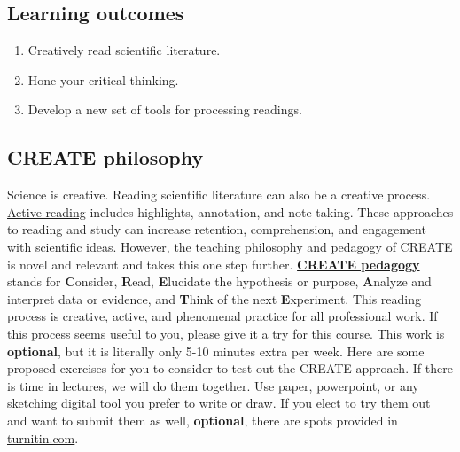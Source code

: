 \documentclass[
]{book}
\providecommand{\tightlist}{%
  \setlength{\itemsep}{0pt}\setlength{\parskip}{0pt}}
\begin{document}
\hypertarget{learning-outcomes-3}{%
\subsection*{Learning outcomes}\label{learning-outcomes-3}}

\begin{enumerate}
\def\labelenumi{\arabic{enumi}.}
\tightlist
\item
  Creatively read scientific literature.\\
\item
  Hone your critical thinking.\\
\item
  Develop a new set of tools for processing readings.
\end{enumerate}

\hypertarget{create-philosophy}{%
\subsection*{CREATE philosophy}\label{create-philosophy}}

Science is creative. Reading scientific literature can also be a creative process. \href{https://help.open.ac.uk/active-reading}{Active reading} includes highlights, annotation, and note taking. These approaches to reading and study can increase retention, comprehension, and engagement with scientific ideas. However, the teaching philosophy and pedagogy of CREATE is novel and relevant and takes this one step further. \href{https://academic.oup.com/genetics/article/176/3/1381/6062159}{\textbf{CREATE pedagogy}} stands for \textbf{C}onsider, \textbf{R}ead, \textbf{E}lucidate the hypothesis or purpose, \textbf{A}nalyze and interpret data or evidence, and \textbf{T}hink of the next \textbf{E}xperiment. This reading process is creative, active, and phenomenal practice for all professional work. If this process seems useful to you, please give it a try for this course. This work is \textbf{optional}, but it is literally only 5-10 minutes extra per week. Here are some proposed exercises for you to consider to test out the CREATE approach. If there is time in lectures, we will do them together. Use paper, powerpoint, or any sketching digital tool you prefer to write or draw. If you elect to try them out and want to submit them as well, \textbf{optional}, there are spots provided in \href{https://turnitin.com}{turnitin.com}.
\end{document}

